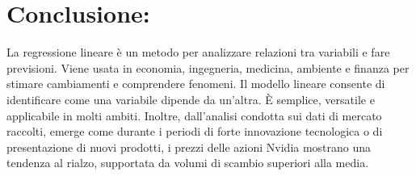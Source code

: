 \documentclass[11pt]{article}
\begin{document}
\section*{Conclusione:}
La regressione lineare è un metodo per analizzare relazioni tra variabili e fare previsioni. Viene usata in economia, ingegneria, medicina, ambiente e finanza 
per stimare cambiamenti e comprendere fenomeni. Il modello lineare consente di identificare come una variabile dipende da un'altra. È semplice, versatile e applicabile 
in molti ambiti.
Inoltre, dall'analisi condotta sui dati di mercato raccolti, emerge come durante i periodi di forte innovazione tecnologica o 
di presentazione di nuovi prodotti, i prezzi delle azioni Nvidia mostrano una tendenza al rialzo, supportata da volumi di scambio superiori alla media.
\end{document}
